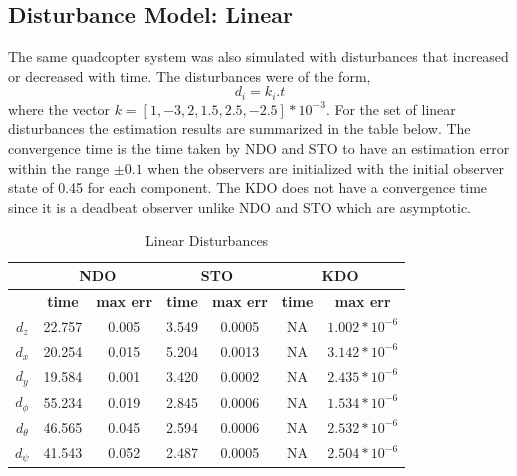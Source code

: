 \documentclass[letterpaper%
, twoside%
, 12pt%
,memoire%
, english%
,creativecommons,hyperref%
]{thETS}
\theoremstyle{newThmStyle}
\begin{document}
\subsection{Disturbance Model: Linear}
The same quadcopter system was also simulated with disturbances that increased or decreased with time. The disturbances were of the form, 
\begin{equation}
d_i = k_i.t
\label{eq:dist_3}
\end{equation}
where the vector $k=[1,-3,2,1.5,2.5,-2.5]*10^{-3}$. 
For the set of linear disturbances the estimation results are summarized in the table below. The convergence time is the time taken by NDO and STO to have an estimation error within the range $\pm0.1$ when the observers are initialized with the initial observer state of 0.45 for each component. The KDO does not have a convergence time since it is a deadbeat observer unlike NDO and STO which are asymptotic.
\begin{table}[!htbp]
\centering
\caption{Linear Disturbances}
\begin{tabular}{|c|c|c|c|c|c|c|}
\hline
{}  &  \multicolumn{2}{c|}{\textbf{NDO}} & \multicolumn{2}{c|}{\textbf{STO}} & \multicolumn{2}{c|}{\textbf{KDO}}\\
\hline
{}        &  \textbf{time}  & \textbf{max err}  & \textbf{time}  & \textbf{max err}& \textbf{time}  & \textbf{max err}\\
$d_z$     &  22.757 & 0.005   & 3.549  & 0.0005 & NA     & $1.002*10^{-6}$\\
$d_x$     &  20.254 & 0.015   & 5.204  & 0.0013 & NA     & $3.142*10^{-6}$\\
$d_y$     &  19.584 & 0.001   & 3.420  & 0.0002 & NA     & $2.435*10^{-6}$\\
$d_\phi$  &  55.234 & 0.019   & 2.845  & 0.0006 & NA     & $1.534*10^{-6}$\\
$d_\theta$&  46.565 & 0.045   & 2.594  & 0.0006 & NA     & $2.532*10^{-6}$\\
$d_\psi$  &  41.543 & 0.052   & 2.487  & 0.0005 & NA     & $2.504*10^{-6}$\\
\hline
\end{tabular}
\end{table}
\end{document}
